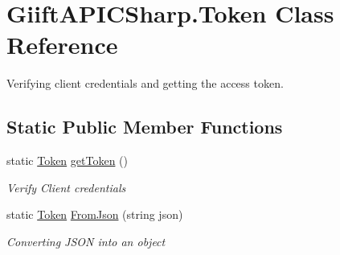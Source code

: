 \hypertarget{class_giift_a_p_i_c_sharp_1_1_token}{}\section{Giift\+A\+P\+I\+C\+Sharp.\+Token Class Reference}
\label{class_giift_a_p_i_c_sharp_1_1_token}


Verifying client credentials and getting the access token.  


\subsection*{Static Public Member Functions}
\begin{DoxyCompactItemize}
\item 
static \hyperlink{class_giift_a_p_i_c_sharp_1_1_token}{Token} \hyperlink{class_giift_a_p_i_c_sharp_1_1_token_a6e8bfdf7b965d3e26908e3cfb980c909}{get\+Token} ()
\begin{DoxyCompactList}\small\item\em Verify Client credentials \end{DoxyCompactList}\item 
static \hyperlink{class_giift_a_p_i_c_sharp_1_1_token}{Token} \hyperlink{class_giift_a_p_i_c_sharp_1_1_token_abfbcfd0417479655fecd80c7f1c3285d}{From\+Json} (string json)
\begin{DoxyCompactList}\small\item\em Converting J\+S\+ON into an object \end{DoxyCompactList}\end{DoxyCompactItemize}
